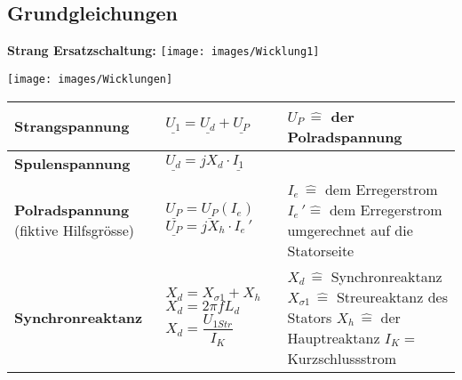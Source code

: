     \begin{minipage}[b]{0.5\linewidth}
        \subsection{Grundgleichungen}
        \textbf{Strang Ersatzschaltung:}\newline
        \texttt{[image: images/Wicklung1]}
    \end{minipage}
    \begin{minipage}[t]{0.5\linewidth}
        \texttt{[image: images/Wicklungen]}
    \end{minipage}
    \vspace{-1cm}
    \begin{longtable}[b]{| C{5cm}| P{8.5cm} | P{5 cm} |}
    	\hline
        \textbf{Strangspannung} 	&
        $\underline{U_1\!} = \underline{U_d\!} + \underline{U_P\!}$ &
        $U_P \, \widehat{=}$ der Polradspannung
        \\ \hline
        
        \textbf{Spulenspannung}	&
        $\underline{U_d} = jX_d\cdot \underline{I_1}$ &
        \\ \hline
        
        \textbf{Polradspannung} \newline (fiktive Hilfsgrösse) &
        $\underline{U_P} = \underline{U_P}\left(I_e\right)$ \newline\newline
        $\underline{U_P} = jX_h\cdot I_{e}\,'$  &
        $I_e \, \widehat{=}$ dem Erregerstrom \newline
        $I_e \,' \widehat{=}$ dem Erregerstrom umgerechnet auf die Statorseite
        \\ \hline
        
        \textbf{Synchronreaktanz} &
        $X_d = X_{\sigma 1} + X_h$ \newline \newline 
        $X_d = 2\pi f L_d$ \newline \newline
        $X_d = \dfrac{U_{1Str}}{I_K}$&
        $X_d \, \widehat{=} $ Synchronreaktanz \newline
        $X_{\sigma 1} \, \widehat{=}$ Streureaktanz des Stators \newline
        $X_h \, \widehat{=}$ der Hauptreaktanz \newline 
        $I_K =$ Kurzschlussstrom
        \\ \hline
        

\end{longtable}
